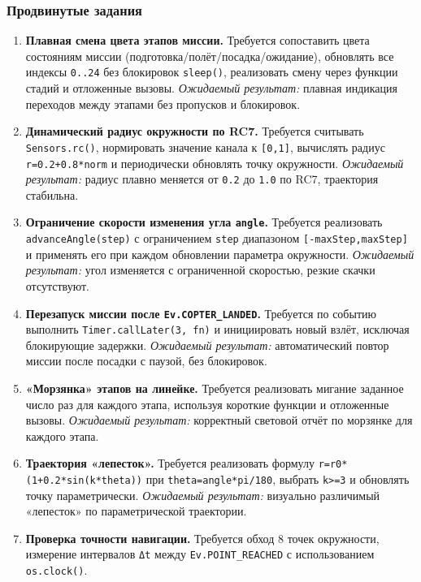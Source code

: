 \subsubsection{Продвинутые задания}
\begin{enumerate}
  \item \textbf{Плавная смена цвета этапов миссии.}
    Требуется сопоставить цвета состояниям миссии (подготовка/полёт/посадка/ожидание), обновлять все индексы \texttt{0..24} без блокировок \texttt{sleep()}, реализовать смену через функции стадий и отложенные вызовы.
    \textit{Ожидаемый результат:} плавная индикация переходов между этапами без пропусков и блокировок.
  \item \textbf{Динамический радиус окружности по RC7.}
    Требуется считывать \texttt{Sensors.rc()}, нормировать значение канала к \texttt{[0,1]}, вычислять радиус \texttt{r=0.2+0.8*norm} и периодически обновлять точку окружности.
    \textit{Ожидаемый результат:} радиус плавно меняется от \texttt{0.2} до \texttt{1.0} по RC7, траектория стабильна.
  \item \textbf{Ограничение скорости изменения угла \texttt{angle}.}
    Требуется реализовать \texttt{advanceAngle(step)} с ограничением \texttt{step} диапазоном \texttt{[-maxStep,maxStep]} и применять его при каждом обновлении параметра окружности.
    \textit{Ожидаемый результат:} угол изменяется с ограниченной скоростью, резкие скачки отсутствуют.
  \item \textbf{Перезапуск миссии после \texttt{Ev.COPTER\_LANDED}.}
    Требуется по событию выполнить \texttt{Timer.callLater(3, fn)} и инициировать новый взлёт, исключая блокирующие задержки.
    \textit{Ожидаемый результат:} автоматический повтор миссии после посадки с паузой, без блокировок.
  \item \textbf{«Морзянка» этапов на линейке.}
    Требуется реализовать мигание заданное число раз для каждого этапа, используя короткие функции и отложенные вызовы.
    \textit{Ожидаемый результат:} корректный световой отчёт по морзянке для каждого этапа.
  \item \textbf{Траектория «лепесток».}
    Требуется реализовать формулу \texttt{r=r0*(1+0.2*sin(k*theta))} при \texttt{theta=angle*pi/180}, выбрать \texttt{k>=3} и обновлять точку параметрически.
    \textit{Ожидаемый результат:} визуально различимый «лепесток» по параметрической траектории.
  \item \textbf{Проверка точности навигации.}
    Требуется обход 8 точек окружности, измерение интервалов \texttt{Δt} между \texttt{Ev.POINT\_REACHED} с использованием \texttt{os.clock()}.

\end{enumerate}
